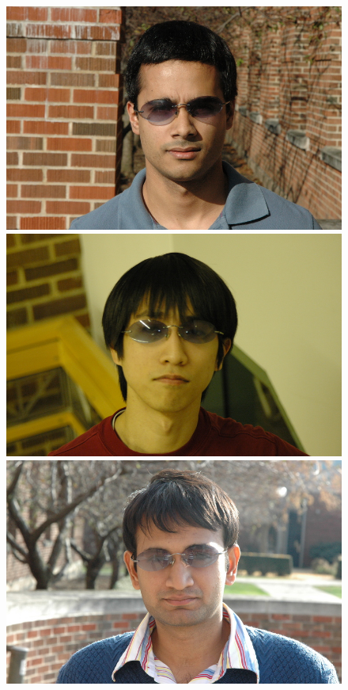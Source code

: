 \begin{figure}
\includegraphics[scale=0.35,clip=true]{figures_cvpr/examples/3/DSC_1623.JPG} 
\includegraphics[scale=0.35,clip=true]{figures_cvpr/examples/3/DSC_1652.JPG} 
\includegraphics[scale=0.35,clip=true]{figures_cvpr/examples/3/DSC_1675.JPG} 

\end{figure}
